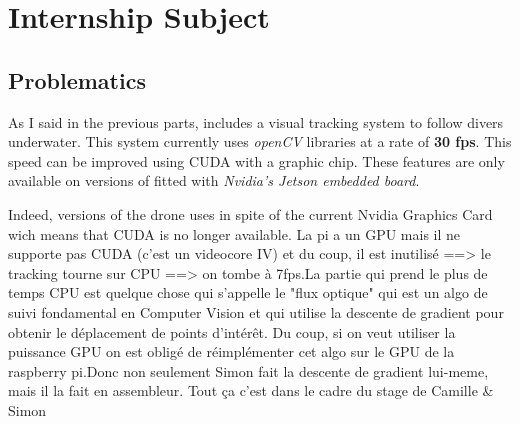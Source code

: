 
\chapter{Internship Subject} %

\label{Chapter4} %




\section{Problematics}

As I said in the previous parts, \iBubble{} includes a visual tracking system to follow divers underwater. This system currently  uses \emph{openCV} libraries at a rate of \textbf{30 fps}. This speed can be improved using CUDA with a graphic chip. These features are only available on  versions of \iBubble fitted with \emph{Nvidia's Jetson embedded board}.

Indeed,  versions of the drone uses \rasp{} in spite of the current Nvidia Graphics Card wich means that CUDA is no longer available.
La pi a un GPU mais il ne supporte pas CUDA (c'est un videocore IV) et du coup, il est inutilisé ==> le tracking tourne sur CPU ==> on tombe à 7fps.La partie qui prend le plus de temps CPU est quelque chose qui s'appelle le "flux optique" qui est un algo de suivi fondamental en Computer Vision et qui utilise la descente de gradient pour obtenir le déplacement de points d'intérêt. Du coup, si on veut utiliser la puissance GPU on est obligé de réimplémenter cet algo sur le GPU de la raspberry pi.Donc non seulement Simon fait la descente de gradient lui-meme, mais il la fait en assembleur. Tout ça c'est dans le cadre du stage de Camille \& Simon


